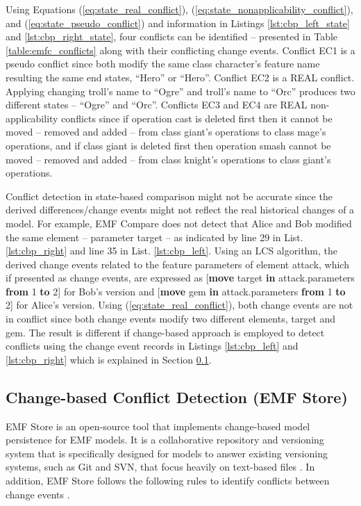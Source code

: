 Using Equations (\ref{eq:state_real_conflict}), (\ref{eq:state_nonapplicability_conflict}), and (\ref{eq:state_pseudo_conflict}) and information in Listings \ref{lst:cbp_left_state} and \ref{lst:cbp_right_state}, four conflicts can be identified -- presented in Table \ref{table:emfc_conflicts} along with their conflicting change events. Conflict \textsf{EC1} is a \textsf{pseudo} conflict since both modify the same class \textsf{character}'s feature \textsf{name} resulting the same end states, ``Hero'' or ``Hero''. Conflict \textsf{EC2} is a \textsf{REAL} conflict. Applying changing \textsf{troll}'s \textsf{name} to ``Ogre'' and \textsf{troll}'s \textsf{name} to ``Orc'' produces two different states -- ``Ogre'' and ``Orc''. Conflicts \textsf{EC3} and \textsf{EC4} are \textsf{REAL} non-applicability conflicts since if operation \textsf{cast} is deleted first then it cannot be moved -- removed and added -- from class \textsf{giant}'s \textsf{operations} to class \textsf{mage}'s \textsf{operations}, and if class \textsf{giant} is deleted first then operation \textsf{smash} cannot be moved -- removed and added -- from  class \textsf{knight}'s \textsf{operations} to class \textsf{giant}'s \textsf{operations}.

Conflict detection in state-based comparison might not be accurate since the derived differences/change events might not reflect the real historical changes of a model. For example, EMF Compare \cite{emfcompare2018developer} does not detect that Alice and Bob modified the same element -- parameter \textsf{target} -- as indicated by line 29 in List. \ref{lst:cbp_right} and line 35 in List. \ref{lst:cbp_left}. Using an LCS algorithm, the derived change events related to the feature \textsf{parameters} of element \textsf{attack}, which if presented as change events, are expressed as [\textsf{\small \textbf{move} target \textbf{in} attack.parameters \textbf{from} 1 \textbf{to} 2}] for Bob's version and [\textsf{\small \textbf{move} gem \textbf{in} attack.parameters \textbf{from} 1 \textbf{to} 2}] for Alice's version. Using (\ref{eq:state_real_conflict}), both change events are not in conflict since both change events modify two different elements, \textsf{target} and \textsf{gem}. The result is different if change-based approach is employed to detect conflicts using the change event records in Listings \ref{lst:cbp_left} and \ref{lst:cbp_right} which is explained in Section \ref{sec:emfstore_conflict_detection}.

\subsection{Change-based Conflict Detection (EMF Store)}
\label{sec:emfstore_conflict_detection}
EMF Store \cite{koegel2010emfstore} is an open-source tool that implements change-based model persistence for EMF models. It is a collaborative repository and versioning system that is specifically designed for models to answer existing versioning systems, such as Git and SVN, that focus heavily on text-based files \cite{emfstore2019what}. In addition, EMF Store follows the following rules to identify conflicts between change events \cite{koegel2010operation}. 

